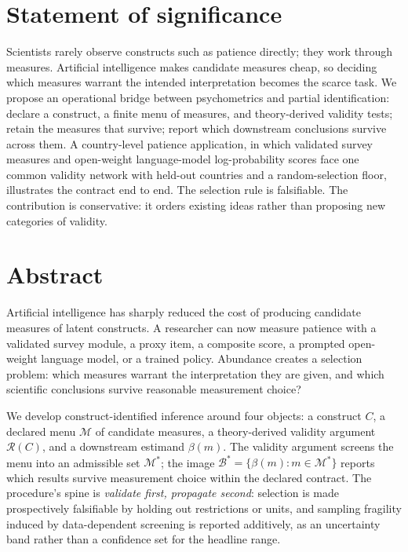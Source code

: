 \documentclass[10pt,letterpaper]{article}
\newcommand{\M}{\ensuremath{\mathcal{M}}}
\newcommand{\Rset}{\mathcal{R}}
\newcommand{\Bset}{\mathcal{B}}
\begin{document}
\vspace{0.85em}

\section*{Statement of significance}
Scientists rarely observe constructs such as patience directly; they work through measures.
Artificial intelligence makes candidate measures cheap, so deciding which measures warrant the intended interpretation becomes the scarce task.
We propose an operational bridge between psychometrics and partial identification: declare a construct, a finite menu of measures, and theory-derived validity tests; retain the measures that survive; report which downstream conclusions survive across them.
A country-level patience application, in which validated survey measures and open-weight language-model log-probability scores face one common validity network with held-out countries and a random-selection floor, illustrates the contract end to end.
The selection rule is falsifiable.
The contribution is conservative: it orders existing ideas rather than proposing new categories of validity.

\section*{Abstract}
Artificial intelligence has sharply reduced the cost of producing candidate measures of latent constructs.
A researcher can now measure patience with a validated survey module, a proxy item, a composite score, a prompted open-weight language model, or a trained policy.
Abundance creates a selection problem: which measures warrant the interpretation they are given, and which scientific conclusions survive reasonable measurement choice?

We develop construct-identified inference around four objects: a construct $C$, a declared menu $\M$ of candidate measures, a theory-derived validity argument $\Rset(C)$, and a downstream estimand $\beta(m)$.
The validity argument screens the menu into an admissible set $\M^*$; the image $\Bset^*=\{\beta(m):m\in\M^*\}$ reports which results survive measurement choice within the declared contract.
The procedure's spine is \emph{validate first, propagate second}: selection is made prospectively falsifiable by holding out restrictions or units, and sampling fragility induced by data-dependent screening is reported additively, as an uncertainty band rather than a confidence set for the headline range.
\end{document}
